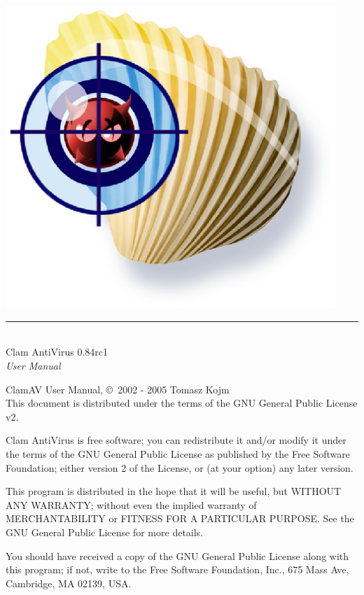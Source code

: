 \documentclass[a4paper,titlepage,12pt]{article}
\date{}
\begin{document}
    \setcounter{page}{0}

    \pagestyle{empty}
    \includegraphics[width=353pt]{clam.eps}
    \vspace{3cm}
    \begin{flushright}
	\rule[-1ex]{8cm}{3pt}\\
	\huge Clam AntiVirus 0.84rc1\\
	\huge \emph{User Manual}\\
    \end{flushright}

    \newpage
    \pagestyle{fancy}
    \tableofcontents
    \vspace{12.0cm}

    \noindent
    \begin{boxedminipage}[b]{\textwidth}
    ClamAV User Manual, \copyright \  2002 - 2005 Tomasz Kojm\\
    This document is distributed under the terms of the GNU General
    Public License v2.
    \end{boxedminipage}

    \vspace{1.0cm}

    \noindent
    \begin{boxedminipage}[b]{\textwidth}
    Clam AntiVirus is free software; you can redistribute it and/or modify
    it under the terms of the GNU General Public License as published by
    the Free Software Foundation; either version 2 of the License, or
    (at your option) any later version.

    This program is distributed in the hope that it will be useful,
    but WITHOUT ANY WARRANTY; without even the implied warranty of
    MERCHANTABILITY or FITNESS FOR A PARTICULAR PURPOSE.  See the
    GNU General Public License for more details.

    You should have received a copy of the GNU General Public License
    along with this program; if not, write to the Free Software
    Foundation, Inc., 675 Mass Ave, Cambridge, MA 02139, USA.
    \end{boxedminipage}
\end{document}
